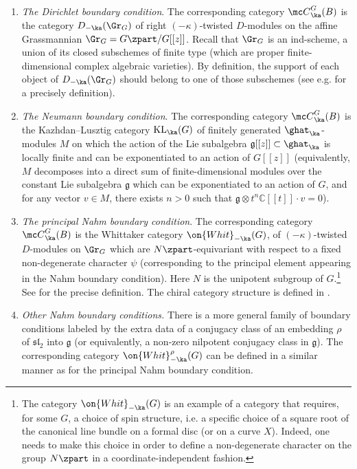\documentclass[11pt,reqno]{amsart}
\theoremstyle{plain}
\numberwithin{equation}{section}
\newcommand{\C}{\mathbb{C}}
\newcommand{\g}{\mathfrak{g}}
\DeclareMathOperator{\KL}{KL}
\theoremstyle{definition}
\begin{document}
\begin{enumerate}

\item {\em The Dirichlet boundary condition}. The corresponding
  category ${\mc C}^G_\ka(B)$ is the category $D_{-\ka}(\Gr_G)$ of
  right $(-\kappa)$-twisted $D$-modules on the affine Grassmannian
  $\Gr_G = G\zpart/G[[z]]$. Recall that $\Gr_G$ is an ind-scheme, a
  union of its closed subschemes of finite type (which are proper
  finite-dimensional complex algebraic varieties). By definition, the
  support of each object of $D_{-\ka}(\Gr_G)$ should belong to one of
  those subschemes (see e.g. \cite{FG1} for a precisely definition).

\bigskip

\item {\em The Neumann boundary condition}. The corresponding category
  ${\mc C}^G_\ka(B)$ is the Kazhdan--Lusztig category $\KL_\ka(G)$
  \cite{KL} of finitely generated $\ghat_\ka$-modules $M$ on which the
  action of the Lie subalgebra $\g[[z]] \subset \ghat_\ka$ is locally
  finite and can be exponentiated to an action of $G[[z]]$
  (equivalently, $M$ decomposes into a direct sum of
  finite-dimensional modules over the constant Lie subalgebra $\g$
  which can be exponentiated to an action of $G$, and for any vector
  $v \in M$, there exists $n>0$ such that $\g \otimes t^n\C[[t]] \cdot
  v = 0$).

\bigskip

\item {\em The principal Nahm boundary condition}. The corresponding
  category ${\mc C}^G_\ka(B)$ is the Whittaker category
  $\on{Whit}_{-\ka}(G)$, of $(-\kappa)$-twisted $D$-modules on $\Gr_G$
  which are $N\zpart$-equivariant with respect to a fixed
  non-degenerate character $\psi$ (corresponding to the principal
  element appearing in the Nahm boundary condition). Here $N$ is the
  unipotent subgroup of $G$.\footnote{The category
    $\on{Whit}_{-\ka}(G)$ is an example of a category that requires,
    for some $G$, a choice of spin structure, i.e. a specific choice
    of a square root of the canonical line bundle on a formal disc (or
    on a curve $X$). Indeed, one needs to make this choice in order to
    define a non-degenerate character on the group $N\zpart$ in a
    coordinate-independent fashion.} See \cite{FGV,Gaitsgory} for the
  precise definition. The chiral category structure is defined in
  \cite{Beraldo,Raskin}.

\bigskip

\item {\em Other Nahm boundary conditions.} There is a more general
  family of boundary conditions labeled by the extra data of a
  conjugacy class of an embedding $\rho$ of $\mathfrak{sl}_2$ into
  $\g$ (or equivalently, a non-zero nilpotent conjugacy class in $\g$).
  The corresponding category $\on{Whit}^\rho_{-\ka}(G)$ can be defined
  in a similar manner as for the principal Nahm boundary condition.
\end{enumerate}
\end{document}
